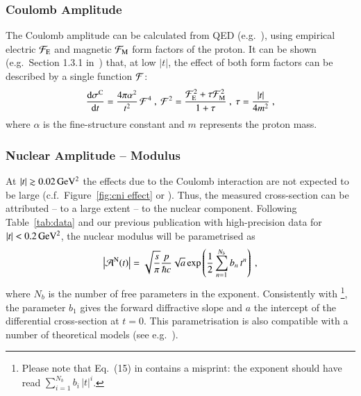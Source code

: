 \subsubsection{Coulomb Amplitude}
\label{sec:cni coulomb}
%
The Coulomb amplitude can be calculated from QED (e.g.~\cite{block96}), using empirical electric ${\cal F}_{\rm E}$ and magnetic ${\cal F}_{\rm M}$ form factors of the proton. It can be shown (e.g.~Section 1.3.1 in~\cite{jan_thesis}) that, at low $|t|$, the effect of both form factors can be described by a single function ${\cal F}$:
\begin{equation}
\label{eq:coul cs}
	{\d\sigma^{\rm C}\over \d t} = {4\pi\alpha^2\over t^2}\,{\cal F}^4\ ,\ 
	{\cal F}^2 = {{\cal F}_{\rm E}^2 + \tau {\cal F}_{\rm M}^2\over 1 + \tau}\ ,\ 
	\tau = {|t|\over 4m^2}\ ,
\end{equation}
where $\alpha$ is the fine-structure constant and $m$ represents the proton mass.



\subsubsection{Nuclear Amplitude -- Modulus}
\label{sec:cni nuclear modulus}

At $|t| \gtrsim 0.02\,{\rm GeV^2}$ the effects due to the Coulomb interaction are not expected to be large (c.f.~Figure~\ref{fig:cni effect} or \cite{kklp11}). Thus, the measured cross-section can be attributed -- to a large extent -- to the nuclear component. Following Table~\ref{tab:data} and our previous publication \cite{8tev-90m} with high-precision data for $|t| < 0.2\,{\rm GeV^2}$, the nuclear modulus will be parametrised as
\begin{equation}
\label{eq:nuc mod}
\left | {\cal A}^{\rm N}(t) \right | = \sqrt{s\over\pi} {p\over \hbar c} \sqrt{a} \exp\left( {1\over 2} \sum\limits_{n = 1}^{N_b} b_n\, t^n \right)\ ,
\end{equation}
where $N_b$ is the number of free parameters in the exponent. Consistently with \cite{8tev-90m} \footnote{%
Please note that Eq.~(15) in \cite{8tev-90m} contains a misprint: the exponent should have read $\sum\limits_{i=1}^{N_b} b_i\, |t|^i$.
}, the parameter $b_1$ gives the forward diffractive slope and $a$ the intercept of the differential cross-section at $t=0$. This parametrisation is also compatible with a number of theoretical models (see e.g.~\cite{elegent}).

